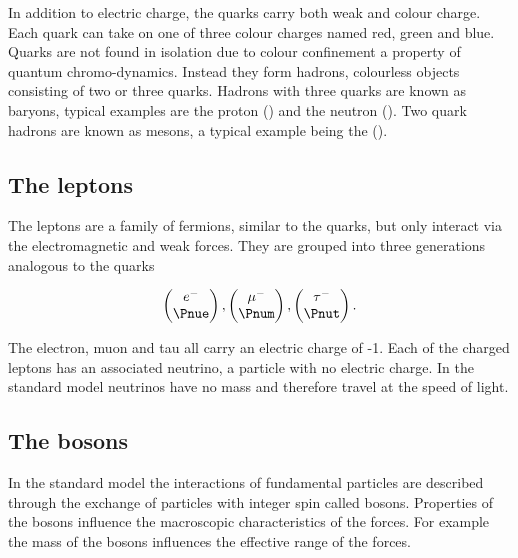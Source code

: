 In addition to electric charge, the quarks carry both weak and colour charge. Each quark can take on one of three colour charges named red, green and blue. Quarks are not found in isolation due to colour confinement a property of quantum chromo-dynamics. Instead they form hadrons, colourless objects consisting of two or three quarks. Hadrons with three quarks are known as baryons, typical examples are the proton (\Pup\Pup\Pdown) and the neutron (\Pup\Pdown\Pdown). Two quark hadrons are known as mesons, a typical example being the  \Ppiplus (\Pup\APdown).

\subsection{The leptons}

The leptons are a family of fermions, similar to the quarks, but only interact via the electromagnetic and weak forces. They are grouped into three generations analogous to the quarks


\begin{equation}
  \begin{pmatrix}
    e^{-} \\
    \Pnue
  \end{pmatrix}
  ,
  \begin{pmatrix}
    \mu^{-} \\
    \Pnum
  \end{pmatrix}
  ,
  \begin{pmatrix}
    \tau^{-} \\
    \Pnut
  \end{pmatrix}
.
\end{equation}

The electron, muon and tau all carry an electric charge of -1. Each of the charged leptons has an associated neutrino, a particle with no electric charge. In the standard model neutrinos have no mass and therefore travel at the speed of light.


\subsection{The bosons}

In the standard model the interactions of fundamental particles are described through the exchange of particles with integer spin called bosons. Properties of the bosons influence the macroscopic characteristics of the forces. For example the mass of the bosons influences the effective range of the forces.

